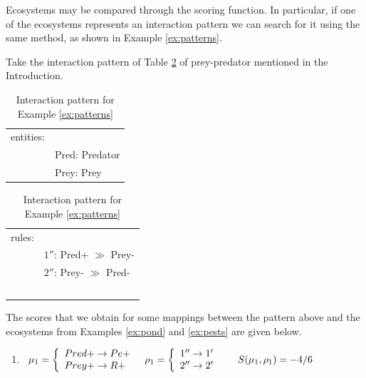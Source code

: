 \documentclass[a4paper,twoside]{article}
\begin{document}
Ecosystems may be compared through the scoring function. In particular, if one of the ecosystems represents an interaction pattern we can search for it using the same method, as shown in Example \ref{ex:patterns}. 



\begin{example} \label{ex:patterns}
Take the interaction pattern of Table \ref{tab:patt} of prey-predator mentioned in the Introduction. 
\begin{table}
\centering
\begin{tabular}{ll}
entities:&\\
    &Pred: Predator \\
    &Prey: Prey \\
\end{tabular} \qquad 
\begin{tabular}{ll}    
rules:&\\
    &$1''$: Pred+  $\gg$ Prey- \\
    &$2''$: Prey-  $\gg$ Pred- \\~
\end{tabular}
\caption{Interaction pattern for Example \ref{ex:patterns}}\label{tab:patt}
\end{table}

The scores that we obtain for some mappings between the pattern above
and the ecosystems from Examples \ref{ex:pond} and  \ref{ex:pests} are given below.

\begin{enumerate}

\item $\begin{array}{l@{\hspace{3mm}}l@{\hspace{3mm}}l}
	\mapcomp_1=\left\{
					\begin{array}{l}
					Pred+ \to Pe+ \\
                    Prey+ \to R+ \\
				\end{array}\right.        
                    &
     \maprule_1=\left\{
                \begin{array}{l}
                    1'' \to 1' \\
					2'' \to 2' \\
					\end{array}\right.
                    &             
 \quad  \gf(\mapcomp_1,\maprule_1)=-4/6
     \end{array}$


\end{enumerate}
\end{example}
\end{document}
